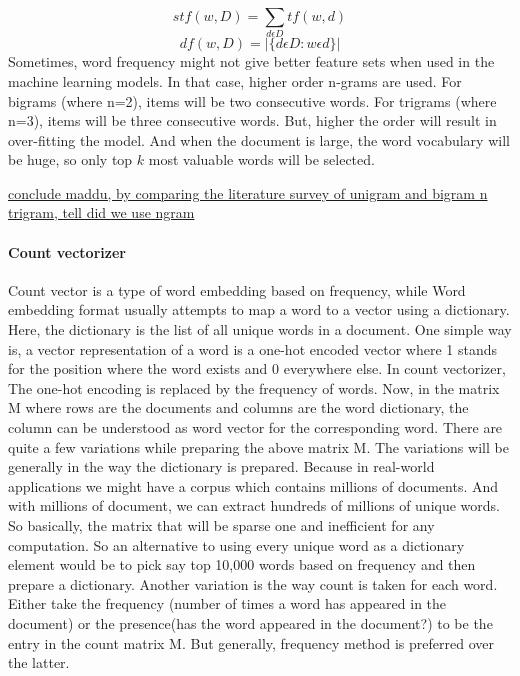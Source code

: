 \begin{equation}
\label{eqn:3}
stf(w,D) = \sum_{d \epsilon D} tf(w,d)
\end{equation}
\begin{equation}
\label{eqn:4}
df(w,D) = |\{d \epsilon D: w \epsilon d \}|
\end{equation}
Sometimes, word frequency might not give better feature sets when used in the machine learning models. In that case, higher order n-grams are used. For bigrams (where n=2), items will be two consecutive words. For trigrams (where n=3), items will be three consecutive words. But, higher the order will result in over-fitting the model. And when the document is large, the word vocabulary will be huge, so only top $k$ most valuable words will be selected.

\underline{conclude maddu, by comparing the literature survey of unigram and bigram n trigram, tell did we use ngram}

\paragraph{Count vectorizer}
Count vector is a type of word embedding based on frequency, while Word embedding format usually attempts to map a word to a vector using a dictionary. Here, the dictionary is the list of all unique words in a document. One simple way is, a vector representation of a word is a one-hot encoded vector where 1 stands for the position where the word exists and 0 everywhere else. In count vectorizer, The one-hot encoding is replaced by the frequency of words. Now, in the matrix M where rows are the documents and columns are the word dictionary, the column can be understood as word vector for the corresponding word. There are quite a few variations while preparing the above matrix M. The variations will be generally in the way the dictionary is prepared.
Because in real-world applications we might have a corpus which contains millions of documents. And with millions of document, we can extract hundreds of millions of unique words. So basically, the matrix that will be sparse one and inefficient for any computation. So an alternative to using every unique word as a dictionary element would be to pick say top 10,000 words based on frequency and then prepare a dictionary. Another variation is the way count is taken for each word. Either take the frequency (number of times a word has appeared in the document) or the presence(has the word appeared in the document?) to be the entry in the count matrix M. But generally, frequency method is preferred over the latter.

